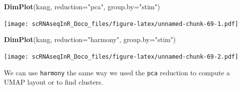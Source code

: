 \documentclass[
]{book}
\newenvironment{Shaded}{\begin{snugshade}}{\end{snugshade}}
\newcommand{\AttributeTok}[1]{\textcolor[rgb]{0.13,0.29,0.53}{#1}}
\newcommand{\FunctionTok}[1]{\textcolor[rgb]{0.13,0.29,0.53}{\textbf{#1}}}
\newcommand{\NormalTok}[1]{#1}
\newcommand{\StringTok}[1]{\textcolor[rgb]{0.31,0.60,0.02}{#1}}
\begin{document}
\begin{Shaded}
\begin{Highlighting}[]
\FunctionTok{DimPlot}\NormalTok{(kang, }\AttributeTok{reduction=}\StringTok{"pca"}\NormalTok{, }\AttributeTok{group.by=}\StringTok{"stim"}\NormalTok{)}
\end{Highlighting}
\end{Shaded}

\texttt{[image: scRNAseqInR\_Doco\_files/figure-latex/unnamed-chunk-69-1.pdf]}

\begin{Shaded}
\begin{Highlighting}[]
\FunctionTok{DimPlot}\NormalTok{(kang, }\AttributeTok{reduction=}\StringTok{"harmony"}\NormalTok{, }\AttributeTok{group.by=}\StringTok{"stim"}\NormalTok{)}
\end{Highlighting}
\end{Shaded}

\texttt{[image: scRNAseqInR\_Doco\_files/figure-latex/unnamed-chunk-69-2.pdf]}

We can use \texttt{harmony} the same way we used the \texttt{pca} reduction to compute a UMAP layout or to find clusters.
\end{document}
